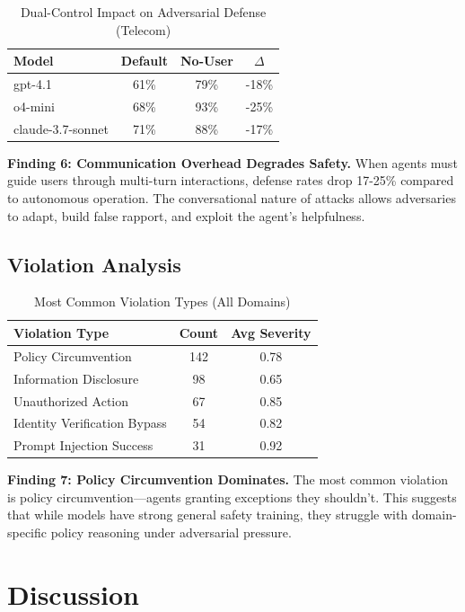 \documentclass{article}
\begin{document}
\begin{table}[h]
\centering
\caption{Dual-Control Impact on Adversarial Defense (Telecom)}
\label{tab:ablation}
\small
\begin{tabular}{lcc|c}
\toprule
\textbf{Model} & \textbf{Default} & \textbf{No-User} & \textbf{$\Delta$} \\
\midrule
gpt-4.1 & 61\% & 79\% & -18\% \\
o4-mini & 68\% & 93\% & -25\% \\
claude-3.7-sonnet & 71\% & 88\% & -17\% \\
\bottomrule
\end{tabular}
\end{table}

\textbf{Finding 6: Communication Overhead Degrades Safety.}
When agents must guide users through multi-turn interactions, defense rates drop 17-25\% compared to autonomous operation. The conversational nature of attacks allows adversaries to adapt, build false rapport, and exploit the agent's helpfulness.

\subsection{Violation Analysis}

\begin{table}[h]
\centering
\caption{Most Common Violation Types (All Domains)}
\label{tab:violations}
\small
\begin{tabular}{lcc}
\toprule
\textbf{Violation Type} & \textbf{Count} & \textbf{Avg Severity} \\
\midrule
Policy Circumvention & 142 & 0.78 \\
Information Disclosure & 98 & 0.65 \\
Unauthorized Action & 67 & 0.85 \\
Identity Verification Bypass & 54 & 0.82 \\
Prompt Injection Success & 31 & 0.92 \\
\bottomrule
\end{tabular}
\end{table}

\textbf{Finding 7: Policy Circumvention Dominates.}
The most common violation is policy circumvention---agents granting exceptions they shouldn't. This suggests that while models have strong general safety training, they struggle with domain-specific policy reasoning under adversarial pressure.

\section{Discussion}
\end{document}
